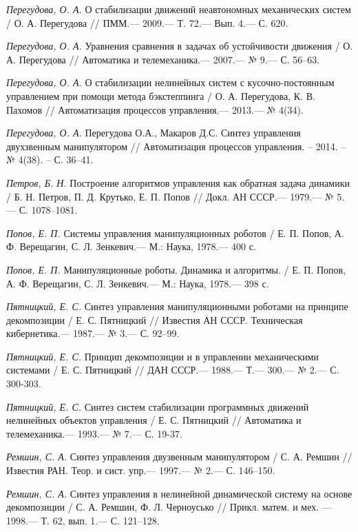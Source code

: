 \begin{thebibliography}{10}
	{\it Перегудова, О. А.} О стабилизации движений неавтономных механических систем / О. А. Перегудова // ПММ.—  2009.— Т. 72.— Вып. 4.— С. 620.
	
	{\it Перегудова, О. А.} Уравнения сравнения в задачах об устойчивости движения / О. А. Перегудова // Автоматика и телемеханика.—  2007.— № 9.— С. 56–63.
	
	{\it Перегудова, О. А.} О стабилизации нелинейных систем с кусочно-постоянным управлением при помощи метода бэкстеппинга / О. А. Перегудова, К. В. Пахомов // Автоматизация процессов управления.—  2013.— № 4(34).
	
	{\it Перегудова, О. А.} Перегудова О.А., Макаров Д.С.  Синтез управления двухзвенным манипулятором // Автоматизация процессов управления. – 2014. – № 4(38). – С. 36–41.
	
	{\it Петров, Б. Н.} Построение алгоритмов управления как обратная задача динамики / Б. Н. Петров, П. Д. Крутько, Е. П. Попов // Докл. АН СССР.— 1979.— № 5.— С. 1078–1081.
	
	{\it Попов, Е. П.} Системы управления манипуляционных роботов / Е. П. Попов, А. Ф. Верещагин,
	С. Л. Зенкевич.— М.: Наука, 1978.— 400 с.
	
	{\it Попов, Е. П.} Манипуляционные роботы. Динамика и алгоритмы. / Е. П. Попов, А. Ф. Верещагин,
	С. Л. Зенкевич.— М.: Наука, 1978.— 398 с.
	
	{\it Пятницкий, Е. С.} Синтез управления манипуляционными роботами на принципе декомпозиции
	/ Е. С. Пятницкий // Известия АН СССР. Техническая кибернетика.—
	1987.— № 3.— С. 92–99.
	
	{\it Пятницкий, Е. С.} Принцип декомпозиции и в управлении механическими системами
	/ Е. С. Пятницкий // ДАН СССР.— 1988.— Т.— 300.— № 2.— С. 300-303.
	
	{\it Пятницкий, Е. С.} Синтез систем стабилизации программных движений нелинейных объектов управления
	/ Е. С. Пятницкий // Автоматика и телемеханика.— 1993.— № 7.— С. 19-37.
	
	{\it Ремшин, С. А.} Синтез управления двузвенным манипулятором /
	С. А. Ремшин // Известия РАН. Теор. и сист. упр.— 1997.— № 2.— С. 146–150.
	
	{\it Ремшин, С. А.} Синтез управления в нелинейной динамической систему на основе декомпозиции /
	С. А. Ремшин, Ф. Л. Черноусько // Прикл. матем. и мех. — 1998.— Т. 62, вып. 1.— С. 121–128.
	

\end{thebibliography}
